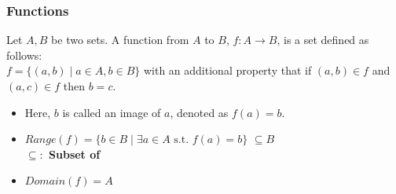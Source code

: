  \begin{frame}[fragile]
\frametitle{Functions}
\begin{definition}
Let $A,B$ be two sets. A function from $A$ to $B$, $f: A \rightarrow B$, is a set defined as follows:\\
$f = \{(a,b)\mid a \in A, b \in B\}$ with an additional property that if $(a,b) \in f$ and $(a,c) \in f$ then $b=c$. 
\end{definition}

\begin{itemize}
\item Here, $b$ is called an image of $a$, denoted as $f(a)=b$.

\item $Range(f) = \{b \in B \mid  \exists a \in A \mbox{ s.t. } f(a)=b\}$   $\subseteq B$\\


\textbf{$\subseteq:$ Subset of }


\item $Domain(f) =A$


\end{itemize}
\end{frame}

